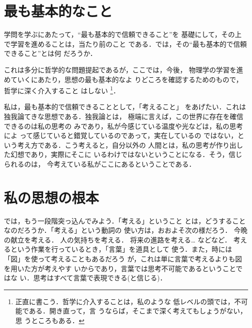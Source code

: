 ﻿%
        \section{最も基本的なこと}
            学問を学ぶにあたって，“最も基本的で信頼できること”を
            基礎にして，その上で学習を進めることは，当たり前のこと
            である．では，その“最も基本的で信頼できること”とは何
            だろうか．

            これは多分に哲学的な問題提起であるが，ここでは，今後，
            物理学の学習を進めていくにあたり，思想の最も基本的なよ
            りどころを確認するためのもので，哲学に深く介入すること
            はしない
                \footnote{
                    正直に書こう．哲学に介入することは，私のような
                    低レベルの頭では，不可能である．開き直って，言
                    うならば，そこまで深く考えてもしょうがない，思
                    うところもある．
                }．

            私は，最も基本的で信頼できることとして，「考えること」
            をあげたい．これは独我論てきな思想である．独我論とは，
            極端に言えば，この世界に存在を確信できるのは私の思考の
            みであり，私が今感じている温度や光などは，私の思考によ
            って感じていると錯覚しているのであって，実在しているの
            ではない，という考え方である．こう考えると，自分以外の
            人間とは，私の思考が作り出した幻想であり，実際にそこに
            いるわけではないということになる．そう，信じられるのは，
            今考えている私がここにあるということである．


        \section{私の思想の根本}
            では，もう一段階突っ込んでみよう．「考える」ということ
            とは，どうすることなのだろうか．「考える」という動詞の
            使い方は，おおよそ次の様だろう．
                今晩の献立を考える．
                人の気持ちを考える．
                将来の進路を考える…
            などなど．
            考えるという作業を行っているとき，「言葉」を道具として
            使う．また，時には「図」を使って考えることもあるだろう
            が，これは単に言葉で考えるよりも図を用いた方が考えやす
            いからであり，言葉では思考不可能であるということではな
            い．思考はすべて言葉で表現できる(と信じる)．

